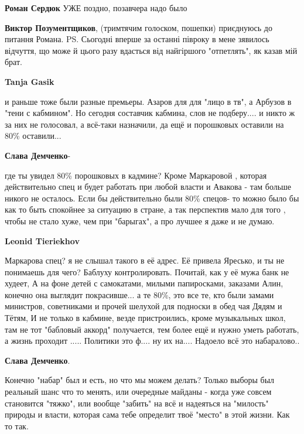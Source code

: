\begin{itemize}
\begin{itemize}
\textbf{Роман Сердюк} УЖЕ поздно, позавчера надо было

\textbf{Виктор Позументщиков}, (тримтячим голоском, пошепки) приєднуюсь до питання Романа.
PS. Сьогодні вперше за останні півроку в мене зявилось відчуття, що може й цього разу вдасться від найгіршого "отпетлять", як казав мій брат.

\textbf{Tanja Gasik}
\end{itemize} %


и раньше тоже были разные премьеры. Азаров для для "лицо в тв", а Арбузов в
"тени с кабмином". Но сегодня составчик кабмина, слов не подберу.... и никто ж
за них не голосовал, а всё-таки назначили, да ещё и порошковых оставили на 80\%
оставили...

\begin{itemize} %
\textbf{Слава Демченко}- 

где ты увидел 80\% порошковых в кадмине? Кроме Маркаровой , которая
действительно спец и будет работать при любой власти и Авакова - там больше
никого не осталось. Если бы действительно были 80\% спецов- то можно было бы как
то быть спокойнее за ситуацию в стране, а так перспектив мало для того , чтобы
не стало хуже, чем при "барыгах", а про лучшее я даже и не думаю.


\textbf{Leonid Tieriekhov} 

Маркарова спец? я не слышал такого в её адрес. Её привела Яресько, и ты не
понимаешь для чего? Баблуху контролировать. Почитай, как у её мужа банк не
худеет, А на фоне детей с самокатами, милыми папиросками, заказами Алин,
конечно она выглядит покрасивше... а те 80\%, это все те, кто были замами
министров, советниками и прочей шелухой для подноски в обед чая Дядям и Тётям,
И не только в кабмине, везде пристроились, кроме музыкальных школ, там не тот
"бабловый аккорд" получается, тем более ещё и нужно уметь работать, а жизнь
проходит ..... Политики это ф.... ну их на.... Надоело всё это набаралово..

\textbf{Слава Демченко}. 

Конечно "набар" был и есть, но что мы можем делать? Только выборы был реальный
шанс что то менять, или очередные майданы - когда уже совсем становится
"тяжко", или вообще "забить" на всё и надеяться на "милость" природы и власти,
которая сама тебе определит твоё "место" в этой жизни. Как то так.


\end{itemize}
\end{itemize}
